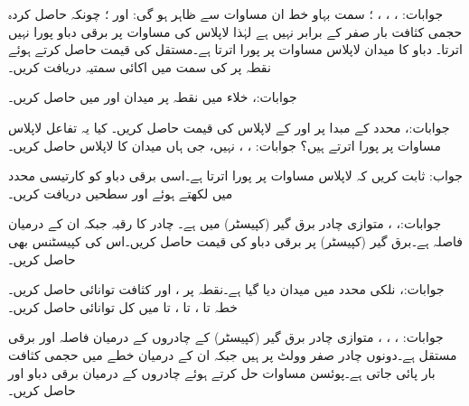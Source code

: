 جوابات: ، ،
 ، ؛ سمت بہاو خط ان مساوات سے ظاہر ہو گی:  اور ؛ چونکہ حاصل کردہ حجمی کثافت بار صفر کے برابر نہیں ہے لہٰذا لاپلاس کی مساوات پر برقی دباو پورا نہیں اترتا۔
دباو کا میدان  لاپلاس مساوات پر پورا اترتا ہے۔مستقل  کی قیمت حاصل کرتے ہوئے نقطہ  پر  کی سمت میں اکائی سمتیہ دریافت کریں۔

جوابات:، 
خلاء میں نقطہ  پر میدان  اور  میں  حاصل کریں۔

جوابات:، 
محدد کے مبدا  پر   اور  کے لاپلاس کی قیمت حاصل کریں۔ کیا یہ تفاعل لاپلاس مساوات پر پورا اترتے ہیں؟
جوابات: ، ، نہیں، جی ہاں
میدان  کا لاپلاس حاصل کریں۔

جواب: 
ثابت کریں کہ  لاپلاس مساوات پر پورا اترتا ہے۔اسی برقی دباو کو کارتیسی محدد میں لکھتے ہوئے  اور  سطحیں دریافت کریں۔

جوابات:، ، 
متوازی چادر برق گیر (کپیسٹر)  میں  ہے۔ چادر کا رقبہ  جبکہ ان کے درمیان فاصلہ  ہے۔برق گیر (کپیسٹر)  پر برقی دباو کی قیمت حاصل کریں۔اس کی کپیسٹنس بھی حاصل کریں۔

جوابات:، 
نلکی محدد میں میدان  دیا گیا ہے۔نقطہ  پر ،  اور کثافت توانائی حاصل کریں۔خطہ  تا ،  تا ،   تا  میں کل توانائی حاصل کریں۔

جوابات: ، ، ،
متوازی چادر برق گیر (کپیسٹر)  کے چادروں کے درمیان فاصلہ  اور برقی مستقل  ہے۔دونوں چادر صفر وولٹ پر ہیں جبکہ ان کے درمیان خطے  میں حجمی کثافت بار  پائی جاتی ہے۔پوئسن  مساوات حل کرتے ہوئے چادروں کے درمیان برقی دباو اور  حاصل کریں۔


